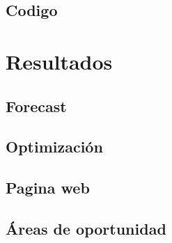 \documentclass[12pt]{article}
\begin{document}
\subsection{Codigo} \label{sec: metodologia}



\section{Resultados} \label{sec: metodologia}


\subsection{Forecast} \label{sec: metodologia}


\subsection{Optimización} \label{sec: metodologia}


\subsection{Pagina web} \label{sec: metodologia}


\subsection{Áreas de oportunidad} \label{sec: metodologia}


 
\end{document}
